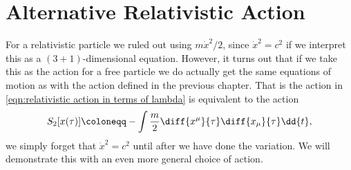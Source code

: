 \documentclass[fleqn]{NotesClass}
\begin{document}
    \section{Alternative Relativistic Action}
    For a relativistic particle we ruled out using \(m\dot{x}^2/2\), since \(\dot{x}^2 = c^2\) if we interpret this as a \((3 + 1)\)-dimensional equation.
    However, it turns out that if we take this as the action for a free particle we do actually get the same equations of motion as with the action defined in the previous chapter.
    That is the action in \cref{eqn:relativistic action in terms of lambda} is equivalent to the action
    \begin{equation}
        S_2[x(\tau)] \coloneqq -\int \frac{m}{2}\diff{x^\mu}{\tau} \diff{x_\mu}{\tau} \dd{t},
    \end{equation}
    we simply forget that \(\dot{x}^2 = c^2\) until after we have done the variation.
    We will demonstrate this with an even more general choice of action.
    
\end{document}
